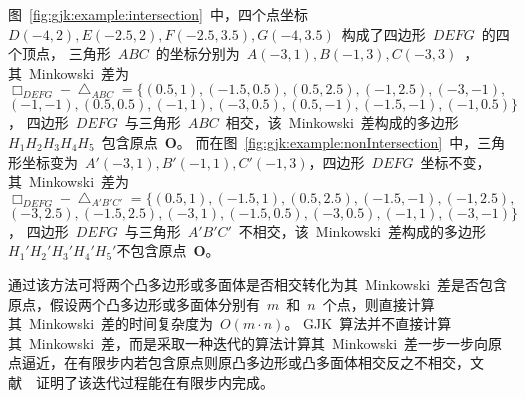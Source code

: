 图~\ref{fig:gjk:example:intersection}~中，四个点坐标~$D(-4, 2), E(-2.5, 2), F(-2.5, 3.5), G(-4, 3.5)$~构成了四边形~$DEFG$~的四个顶点，
三角形~$ABC$~的坐标分别为~$A(-3, 1), B(-1,3), C(-3, 3)$~，
其~Minkowski~差为~$\Box_{DEFG} - \bigtriangleup_{ABC} = \{  (0.5, 1),  (-1.5, 0.5),  (0.5, 2.5), (-1, 2.5),  (-3, -1),$\\$ (-1, -1),  (0.5, 0.5), (-1, 1),  (-3, 0.5),(0.5, -1), (-1.5, -1), (-1, 0.5) \}$，
四边形~$DEFG$~与三角形~$ABC$~相交，该~Minkowski~差构成的多边形~$H_1H_2H_3H_4H_5$~包含原点~$\bm{O}$。
而在图~\ref{fig:gjk:example:nonIntersection}~中，三角形坐标变为~$A'(-3, 1), B'(-1, 1), C'(-1,3)$，四边形~$DEFG$~坐标不变，
其~Minkowski~差为~$\Box_{DEFG} - \bigtriangleup_{A'B'C'} = \{  (0.5, 1), (-1.5, 1),  (0.5, 2.5)  , (-1.5, -1),  (-1, 2.5),$\\$(-3, 2.5),  (-1.5, 2.5), (-3, 1), (-1.5, 0.5), (-3, 0.5), (-1, 1),(-3, -1) \}$，
四边形~$DEFG$~与三角形~$A'B'C'$~不相交，该~Minkowski~差构成的多边形~$H_1'H_2'H_3'H_4'H_5'$不包含原点~$\bm{O}$。

通过该方法可将两个凸多边形或多面体是否相交转化为其~Minkowski~差是否包含原点，假设两个凸多边形或多面体分别有~$m$~和~$n$~个点，则直接计算其~Minkowski~差的时间复杂度为~$O(m \cdot n)$。
GJK~算法并不直接计算其~Minkowski~差，而是采取一种迭代的算法计算其~Minkowski~差一步一步向原点逼近，在有限步内若包含原点则原凸多边形或凸多面体相交反之不相交，文献~~证明了该迭代过程能在有限步内完成。

